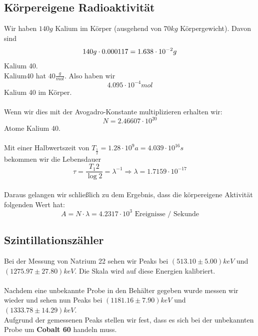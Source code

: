 \documentclass{article}
\begin{document}
\subsection{Körpereigene Radioaktivität}
Wir haben $140g$ Kalium im Körper (ausgehend von $70kg$ Körpergewicht).
Davon sind
$$
140g\cdot 0.000117=1.638\cdot10^{-2}g \\
$$
Kalium 40.\\
Kalium40 hat $40\frac{g}{mol}$. Also haben wir \\
$$4.095\cdot10^{-4}mol$$ Kalium 40 im Körper.\\
\\
Wenn wir dies mit der Avogadro-Konstante multiplizieren erhalten wir:\\
$$N=2.46607\cdot 10^{20}$$ Atome Kalium 40.\\
\\
Mit einer Halbwertszeit von $T_{\frac{1}{2}}= 1.28 \cdot 10^{9}a=4.039\cdot 10^{16}s$ \\
bekommen wir die Lebensdauer $$\tau=\frac{T_{1}{2}}{\log{2}}=\lambda^{-1} \Rightarrow \lambda=1.7159 \cdot 10^{-17}$$
\\
Daraus gelangen wir schließlich zu dem Ergebnis, dass die körpereigene Aktivität folgenden Wert hat:
$$A=N\cdot \lambda = 4.2317\cdot 10^{3} \textrm{ Ereignisse / Sekunde}$$
\subsection{Szintillationszähler}
Bei der Messung von Natrium 22 sehen wir Peaks bei $(513.10 \pm 5.00)\si{keV}$ und $(1275.97 \pm 27.80)\si{keV}$. Die Skala wird auf diese Energien kalibriert.\\
\\
Nachdem eine unbekannte Probe in den Behälter gegeben wurde messen wir wieder und sehen nun Peaks bei $(1181.16 \pm 7.90)\si{keV}$ und $(1333.78 \pm 14.29)\si{keV}$.\\
Aufgrund der gemessenen Peaks stellen wir fest, dass es sich bei der unbekannten Probe um \textbf{Cobalt 60} handeln muss.
\end{document}

